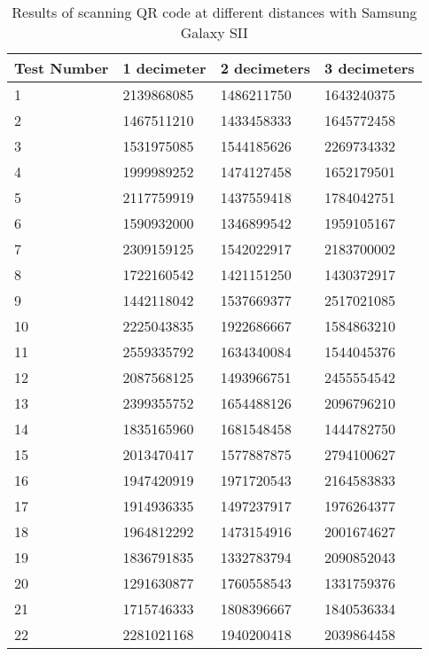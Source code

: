 \begin{table}[ht!]
\begin{tabularx}{\textwidth}{l|X|X|X}
		\end{tabularx}
	\end{table}

	\begin{table}[ht!]
    		\caption{Results of scanning QR code at different distances with Samsung Galaxy SII} \label{tab:distamceGoogleGlassFull}
		\centering \begin{tabularx}{\textwidth}{l|X|X|X} \hline
		\textbf{Test Number} & \textbf{1 decimeter} & \textbf{2 decimeters} & \textbf{3 decimeters} \\ \hline \hline
		
		1&	2139868085	&	1486211750	&	1643240375	\\ \hline
		2&	1467511210	&	1433458333	&	1645772458	\\ \hline
		3&	1531975085	&	1544185626	&	2269734332	\\ \hline
		4&	1999989252	&	1474127458	&	1652179501	\\ \hline
		5&	2117759919	&	1437559418	&	1784042751	\\ \hline
		6&	1590932000	&	1346899542	&	1959105167	\\ \hline
		7&	2309159125	&	1542022917	&	2183700002	\\ \hline
		8&	1722160542	&	1421151250	&	1430372917	\\ \hline
		9&	1442118042	&	1537669377	&	2517021085	\\ \hline
		10&	2225043835	&	1922686667	&	1584863210	\\ \hline
		11&	2559335792	&	1634340084	&	1544045376	\\ \hline
		12&	2087568125	&	1493966751	&	2455554542	\\ \hline
		13&	2399355752	&	1654488126	&	2096796210	\\ \hline
		14&	1835165960	&	1681548458	&	1444782750	\\ \hline
		15&	2013470417	&	1577887875	&	2794100627	\\ \hline
		16&	1947420919	&	1971720543	&	2164583833	\\ \hline
		17&	1914936335	&	1497237917	&	1976264377	\\ \hline
		18&	1964812292	&	1473154916	&	2001674627	\\ \hline
		19&	1836791835	&	1332783794	&	2090852043	\\ \hline
		20&	1291630877	&	1760558543	&	1331759376	\\ \hline
		21&	1715746333	&	1808396667	&	1840536334	\\ \hline
		22&	2281021168	&	1940200418	&	2039864458	\\ \hline

\end{tabularx}
\end{table}
